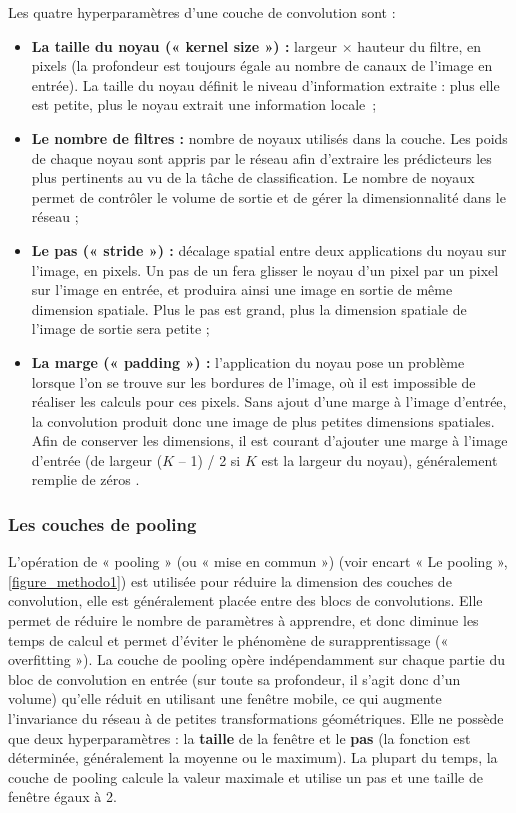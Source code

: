 Les quatre hyperparamètres d’une couche de convolution sont :

\begin{itemize}
    \item \textbf{La taille du noyau (« kernel size ») :} largeur $\times$ hauteur du filtre, en pixels (la profondeur est toujours égale au nombre de canaux de l’image en entrée). La taille du noyau définit le niveau d’information extraite : plus elle est petite, plus le noyau extrait une information locale~;
    
    \item \textbf{Le nombre de filtres :} nombre de noyaux utilisés dans la couche. Les poids de chaque noyau sont appris par le réseau afin d’extraire les prédicteurs les plus pertinents au vu de la tâche de classification. Le nombre de noyaux permet de contrôler le volume de sortie et de gérer la dimensionnalité dans le réseau ;
    
    \item \textbf{Le pas (« stride ») :} décalage spatial entre deux applications du noyau sur l’image, en pixels. Un pas de un fera glisser le noyau d’un pixel par un pixel sur l’image en entrée, et produira ainsi une image en sortie de même dimension spatiale. Plus le pas est grand, plus la dimension spatiale de l’image de sortie sera petite ;
    
    \item \textbf{La marge (« padding ») :} l’application du noyau pose un problème lorsque l’on se trouve sur les bordures de l’image, où il est impossible de réaliser les calculs pour ces pixels. Sans ajout d’une marge à l’image d’entrée, la convolution produit donc une image de plus petites dimensions spatiales. Afin de conserver les dimensions, il est courant d’ajouter une marge à l’image d’entrée (de largeur ($K$ – 1) / 2 si $K$ est la largeur du noyau), généralement remplie de zéros \citep{aggarwal_neural_2018}.
    
\end{itemize}

\subsubsection{Les couches de pooling}

L’opération de « pooling » (ou « mise en commun ») (voir encart « Le pooling », \autoref{figure_methodo1}) est utilisée pour réduire la dimension des couches de convolution, elle est généralement placée entre des blocs de convolutions. Elle permet de réduire le nombre de paramètres à apprendre, et donc diminue les temps de calcul et permet d’éviter le phénomène de surapprentissage (« overfitting »). La couche de pooling opère indépendamment sur chaque partie du bloc de convolution en entrée (sur toute sa profondeur, il s’agit donc d’un volume) qu’elle réduit en utilisant une fenêtre mobile, ce qui augmente l’invariance du réseau à de petites transformations géométriques. Elle ne possède que deux hyperparamètres : la \textbf{taille} de la fenêtre et le \textbf{pas} (la fonction est déterminée, généralement la moyenne ou le maximum). La plupart du temps, la couche de pooling calcule la valeur maximale et utilise un pas et une taille de fenêtre égaux à 2. 

